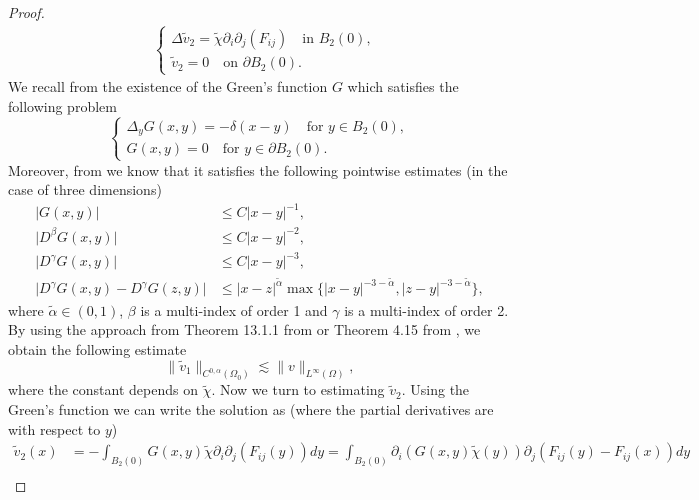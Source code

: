 \documentclass[12pt,a4paper]{article}
\theoremstyle{definition}
\theoremstyle{remark}
\numberwithin{equation}{section}
\begin{document}
\begin{appendices}
\begin{proof}
\begin{align*}
&\begin{cases}
\Delta \widetilde{v}_2 = \widetilde{\chi} \partial_i \partial_j (F_{ij}) \quad \text{in } B_2 (0), \\
\widetilde{v}_2 = 0 \quad \text{on } \partial B_2 (0).
\end{cases}
\end{align*}
We recall from \cite[~Theorem 1]{dolzmann} the existence of the Green's function $G$ which satisfies the following problem
\begin{equation}
\begin{cases}
\Delta_y G(x,y) = - \delta (x-y) \quad \text{for } y \in B_2 (0), \\
G(x, y) = 0 \quad \text{for } y \in \partial B_2 (0). 
\end{cases}
\end{equation}
Moreover, from \cite[~Theorem 1]{dolzmann} we know that it satisfies the following pointwise estimates (in the case of three dimensions)
\begingroup
\allowdisplaybreaks
\begin{align}
\lvert G(x,y) \rvert &\leq C \lvert x - y \rvert^{-1}, \label{pointwise1} \\
\lvert D^\beta G(x,y) \rvert &\leq C \lvert x - y \rvert^{-2}, \label{pointwise2} \\
\lvert D^\gamma G(x, y)  \rvert &\leq C \lvert x - y \rvert^{-3}, \label{pointwise3} \\
\lvert D^\gamma G(x, y) - D^\gamma G(z,y) \rvert &\leq \lvert x -z \rvert^{ \widetilde{\alpha}} \max \{ \lvert x - y \rvert^{-3 - \widetilde{\alpha}} , \lvert z - y \rvert^{-3 - \widetilde{\alpha}} \}, \label{pointwise4}
\end{align}
\endgroup
where $\widetilde{\alpha} \in (0,1)$, $\beta$ is a multi-index of order 1 and $\gamma$ is a multi-index of order 2. By using the approach from Theorem 13.1.1 from \cite{jostPDE} or Theorem 4.15 from \cite{gilbarg}, we obtain the following estimate
\begin{equation*}
\lVert \widetilde{v}_1 \rVert_{C^{0,\alpha} (\Omega_0)} \lesssim \lVert v \rVert_{L^\infty (\Omega)},
\end{equation*}
where the constant depends on $\widetilde{\chi}$. Now we turn to estimating $\widetilde{v}_2$. Using the Green's function we can write the solution as (where the partial derivatives are with respect to $y$)
\begin{align*}
\widetilde{v}_2 (x) &= - \int_{B_2 (0)} G(x,y) \widetilde{\chi} \partial_i \partial_j (F_{ij} (y)) dy = \int_{B_2 (0)} \partial_i (G(x,y) \widetilde{\chi} (y)) \partial_j (F_{ij} (y) - F_{ij} (x) ) dy  \\

\end{align*}
\end{proof}
\end{appendices}
\end{document}
